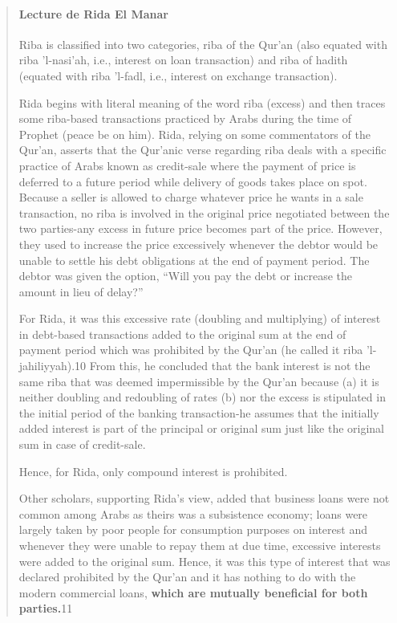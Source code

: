 \begin{quote}
\paragraph{Lecture de Rida El Manar}
Riba is classified into two categories, riba of the Qur'an (also equated with riba 'l-nasi'ah, i.e., interest on loan transaction) and riba of hadith (equated with riba 'l-fadl, i.e., interest on exchange transaction).

Rida begins with literal meaning of the word riba (excess) and then traces some riba-based transactions practiced by Arabs during the time of Prophet (peace be on him). Rida, relying on some commentators of the Qur'an, asserts that the Qur'anic verse regarding riba deals with a specific practice of Arabs known as credit-sale where the payment of price is deferred to a future period while delivery of goods takes place on spot. Because a seller is allowed to charge whatever price he wants in a sale transaction, no riba is involved in the original price negotiated between the two parties-any excess in future price becomes part of the price. However, they used to increase the price excessively whenever the debtor would be unable to settle his debt obligations at the end of payment period. The debtor was given the option, “Will you pay the debt or increase the amount in lieu of delay?”

For Rida, it was this excessive rate (doubling and multiplying) of interest in debt-based transactions added to the original sum at the end of payment period which was prohibited by the Qur'an (he called it riba 'l-jahiliyyah).10 From this, he concluded that the bank interest is not the same riba that was deemed impermissible by the Qur'an because (a) it is neither doubling and redoubling of rates (b) nor the excess is stipulated in the initial period of the banking transaction-he assumes that the initially added interest is part of the principal or original sum just like the original sum in case of credit-sale. 
\begin{Synthesis}
Hence, for Rida, only compound interest is prohibited.
\end{Synthesis} 

Other scholars, supporting Rida's view, added that business loans were not common among Arabs as theirs was a subsistence economy; loans were largely taken by poor people for consumption purposes on interest and whenever they were unable to repay them at due time, excessive interests were added to the original sum. Hence, it was this type of interest that was declared prohibited by the Qur'an and it has nothing to do with the modern commercial loans, \textbf{which are mutually beneficial for both parties.}11


\end{quote}
